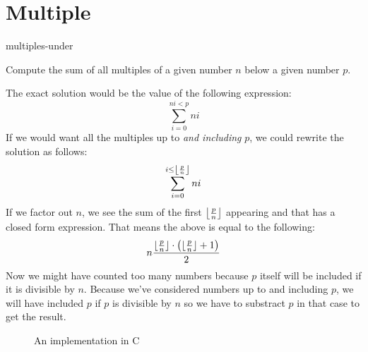 \documentclass[main.tex]{subfiles}
\begin{document}
\chapter{Multiple}

\begin{libraryfile}
  \begin{algorithm}{1}{1}{multiples-under}
    \begin{algorithm-description}
        Compute the sum of all multiples of a given number $n$ below a given number $p$.
    \end{algorithm-description}
    \begin{algorithm-explanation}
      The exact solution would be the value of the following expression:
      \[ \sum_{i=0}^{ni < p}ni \]
      If we would want all the multiples up to \textit{and including} $p$, we could rewrite the solution as follows:
      \[ \sum_{i=0}^{i \le \floor*{\frac{p}{n}}}ni \]
      If we factor out $n$, we see the sum of the first $\floor*{\frac{p}{n}}$ appearing and that has a closed form expression.
      That means the above is equal to the following:
      \[ n\frac{\floor{\frac{p}{n}}\cdot \left(\floor{\frac{p}{n}} + 1\right)}{2} \]
      Now we might have counted too many numbers because $p$ itself will be included if it is divisible by $n$.
      Because we've considered numbers up to and including $p$, we will have included $p$ if $p$ is divisible by $n$ so we have to substract $p$ in that case to get the result.

      \begin{figure}[H]
        \centering
         {}
        \caption{An implementation in C}
      \end{figure}
    \end{algorithm-explanation}
  \end{algorithm}
\end{libraryfile}
\end{document}
